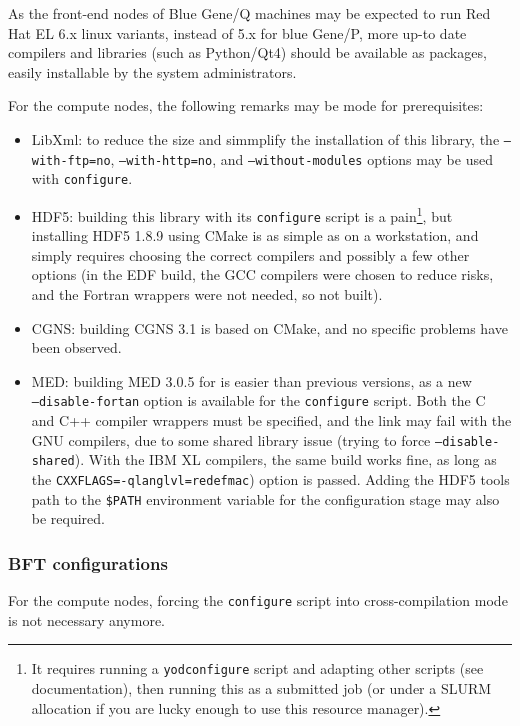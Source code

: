\documentclass[a4paper,10pt,twoside]{article}
\begin{document}
As the front-end nodes of Blue Gene/Q machines may be expected to run
Red Hat EL 6.x linux variants, instead of 5.x for blue Gene/P, more
up-to date compilers and libraries (such as Python/Qt4) should be available
as packages, easily installable by the system administrators.

For the compute nodes, the following remarks may be mode for prerequisites:

\begin{itemize}
\item LibXml: to reduce the size and simmplify the installation of this
library, the \texttt{--with-ftp=no}, \texttt{--with-http=no},
and \texttt{--without-modules} options may be used with \texttt{configure}.
\item HDF5: building this library with its \texttt{configure} script
is a pain\footnote{It requires running a \texttt{yodconfigure}
script and adapting other scripts (see documentation), then running
this as a submitted job (or under a SLURM allocation if you are lucky
enough to use this resource manager).}, but installing HDF5 1.8.9
using CMake is as simple as on a workstation, and simply requires
choosing the correct compilers and possibly a few other options (in
the EDF \CS build, the GCC compilers were chosen to reduce risks, and
the Fortran wrappers were not needed, so not built).
\item CGNS: building CGNS 3.1 is based on CMake, and no specific
problems have been observed.
\item MED: building MED 3.0.5 for \CS is easier than previous versions,
as a new \\ \texttt{--disable-fortan} option is available for the
\texttt{configure} script. Both the C and C++ compiler wrappers
must be specified, and the link may fail with the GNU compilers, due
to some shared library issue (trying to force \texttt{--disable-shared}).
With the IBM XL compilers, the same build works fine, as long as the
\texttt{CXXFLAGS=-qlanglvl=redefmac}) option is passed. Adding
the HDF5 tools path to the \texttt{\$PATH} environment variable for
the  configuration stage may also be required.
\end{itemize}

\subsubsection{BFT configurations}

For the compute nodes, forcing the \texttt{configure} script into
cross-compilation mode is not necessary anymore.
\end{document}
